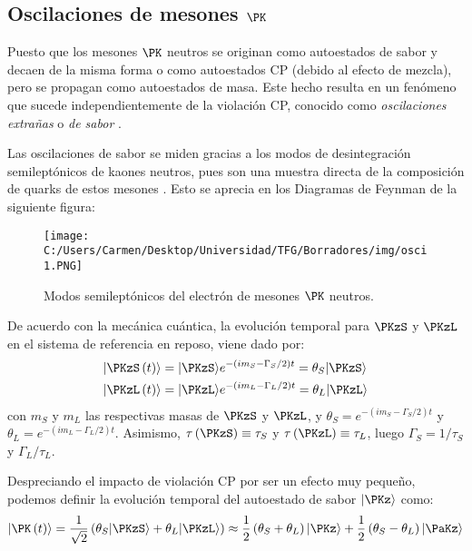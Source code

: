 \subsection{Oscilaciones de mesones $\PK$}\label{sec:kaon_oscillations}
Puesto que los mesones $\PK$ neutros se originan como autoestados de sabor y decaen de la misma forma o como autoestados CP (debido al efecto de mezcla), pero se propagan como autoestados de masa. Este hecho resulta en un fenómeno que sucede independientemente de la violación CP, conocido como \textit{oscilaciones extrañas} o \textit{de sabor} \cite{Thomson}.

Las oscilaciones de sabor se miden gracias a los modos de desintegración semileptónicos de kaones neutros, pues son una muestra directa de la composición de quarks de estos mesones \cite{Helsinki}. Esto se aprecia en los Diagramas de Feynman de la siguiente figura:
\begin{figure}[!ht]
	\centering
	\texttt{[image: C:/Users/Carmen/Desktop/Universidad/TFG/Borradores/img/osci1.PNG]}
	\caption[Modos semileptónicos del electrón de mesones $\PK$ neutros]
	{Modos semileptónicos del electrón de mesones $\PK$ neutros. \cite{Thomson}}
	\label{fig:oscillation1}
\end{figure}

De acuerdo con la mecánica cuántica, la evolución temporal para $\PKzS$ y $\PKzL$ en el sistema de referencia en reposo, viene dado por:
\begin{align}
|\PKzS\left(t\right)\rangle &= |\PKzS\rangle e^{-\left(im_{S}-\Gamma_{S}/2\right)t} = \theta_{S}|\PKzS\rangle \\
|\PKzL\left(t\right)\rangle &= |\PKzL\rangle e^{-\left(im_{L}-\Gamma_{L}/2\right)t} = \theta_{L}|\PKzL\rangle \label{eq:evtempKSKL}
\end{align}
con $m_{S}$ y $m_{L}$ las respectivas masas de $\PKzS$ y $\PKzL$, y $\theta_{S}=e^{-\left(im_{S}-\Gamma_{S}/2\right)t}$ y $\theta_{L}=e^{-\left(im_{L}-\Gamma_{L}/2\right)t}$. Asimismo, $\tau\left(\PKzS\right) \equiv \tau_S$ y $\tau\left(\PKzL\right) \equiv \tau_L$, luego $\Gamma_{S}=1/ \tau_S$ y $\Gamma_{L}/\tau_L$. 

Despreciando el impacto de violación CP por ser un efecto muy pequeño, podemos definir la evolución temporal del autoestado de sabor $|\PKz\rangle$ como:
\begin{equation}
|\PK\left(t\right)\rangle=\dfrac{1}{\sqrt{2}}\left(\theta_{S}|\PKzS\rangle + \theta_{L}|\PKzL\rangle \right) \approx \dfrac{1}{2}\left(\theta_{S}+\theta_{L}\right)|\PKz\rangle + \dfrac{1}{2}\left(\theta_{S}-\theta_{L}\right)|\PaKz\rangle
\end{equation}

